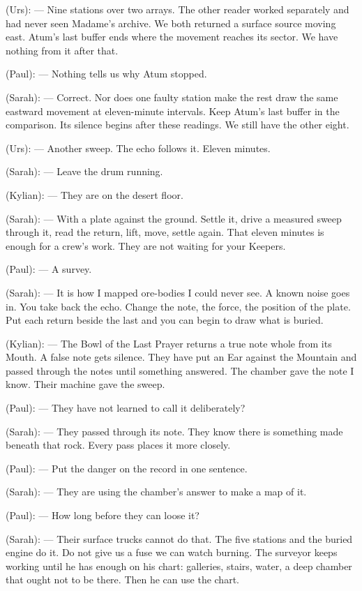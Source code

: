 \begin{room}
(Urs): --- Nine stations over two arrays. The other reader worked separately and had never seen Madame's archive. We both returned a surface source moving east. Atum's last buffer ends where the movement reaches its sector. We have nothing from it after that.

(Paul): --- Nothing tells us why Atum stopped.

(Sarah): --- Correct. Nor does one faulty station make the rest draw the same eastward movement at eleven-minute intervals. Keep Atum's last buffer in the comparison. Its silence begins after these readings. We still have the other eight.

(Urs): --- Another sweep. The echo follows it. Eleven minutes.

(Sarah): --- Leave the drum running.

(Kylian): --- They are on the desert floor.

(Sarah): --- With a plate against the ground. Settle it, drive a measured sweep through it, read the return, lift, move, settle again. That eleven minutes is enough for a crew's work. They are not waiting for your Keepers.

(Paul): --- A survey.

(Sarah): --- It is how I mapped ore-bodies I could never see. A known noise goes in. You take back the echo. Change the note, the force, the position of the plate. Put each return beside the last and you can begin to draw what is buried.

(Kylian): --- The Bowl of the Last Prayer returns a true note whole from its Mouth. A false note gets silence. They have put an Ear against the Mountain and passed through the notes until something answered. The chamber gave the note I know. Their machine gave the sweep.

(Paul): --- They have not learned to call it deliberately?

(Sarah): --- They passed through its note. They know there is something made beneath that rock. Every pass places it more closely.

(Paul): --- Put the danger on the record in one sentence.

(Sarah): --- They are using the chamber's answer to make a map of it.

(Paul): --- How long before they can loose it?

(Sarah): --- Their surface trucks cannot do that. The five stations and the buried engine do it. Do not give us a fuse we can watch burning. The surveyor keeps working until he has enough on his chart: galleries, stairs, water, a deep chamber that ought not to be there. Then he can use the chart.


\end{room}
